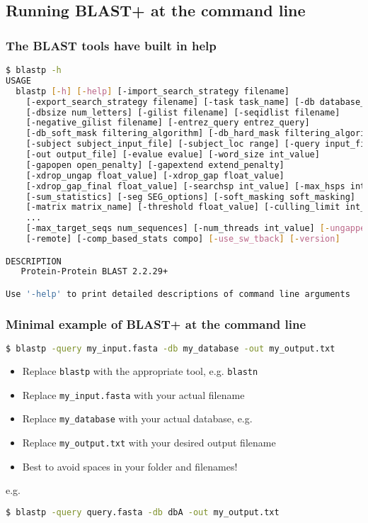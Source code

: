 %

\subsection{Running BLAST+ at the command line}
\begin{frame}[fragile]
  \frametitle{The BLAST tools have built in help}
\begin{lstlisting}[language=sh]
$ blastp -h
USAGE
  blastp [-h] [-help] [-import_search_strategy filename]
    [-export_search_strategy filename] [-task task_name] [-db database_name]
    [-dbsize num_letters] [-gilist filename] [-seqidlist filename]
    [-negative_gilist filename] [-entrez_query entrez_query]
    [-db_soft_mask filtering_algorithm] [-db_hard_mask filtering_algorithm]
    [-subject subject_input_file] [-subject_loc range] [-query input_file]
    [-out output_file] [-evalue evalue] [-word_size int_value]
    [-gapopen open_penalty] [-gapextend extend_penalty]
    [-xdrop_ungap float_value] [-xdrop_gap float_value]
    [-xdrop_gap_final float_value] [-searchsp int_value] [-max_hsps int_value]
    [-sum_statistics] [-seg SEG_options] [-soft_masking soft_masking]
    [-matrix matrix_name] [-threshold float_value] [-culling_limit int_value]
    ...
    [-max_target_seqs num_sequences] [-num_threads int_value] [-ungapped]
    [-remote] [-comp_based_stats compo] [-use_sw_tback] [-version]

DESCRIPTION
   Protein-Protein BLAST 2.2.29+

Use '-help' to print detailed descriptions of command line arguments
\end{lstlisting}
\end{frame}

\begin{frame}[fragile]
  \frametitle{Minimal example of BLAST+ at the command line}
\begin{lstlisting}[language=sh]
$ blastp -query my_input.fasta -db my_database -out my_output.txt
\end{lstlisting}
  \begin{itemize}
    \item Replace \texttt{blastp} with the appropriate tool, e.g. \texttt{blastn}
    \item Replace \texttt{my\_input.fasta} with your actual filename
    \item Replace \texttt{my\_database} with your actual database, e.g. 
    \item Replace \texttt{my\_output.txt} with your desired output filename
    \item Best to avoid spaces in your folder and filenames!
  \end{itemize}
  e.g.
\begin{lstlisting}[language=sh]
$ blastp -query query.fasta -db dbA -out my_output.txt
\end{lstlisting}
\end{frame}
